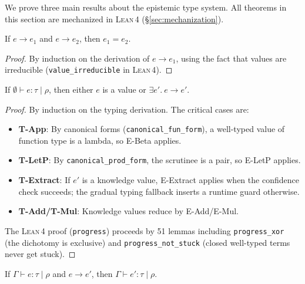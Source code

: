 \documentclass[acmsmall,screen,review,anonymous]{acmart}
\newcommand{\lean}{\textsc{Lean\,4}\xspace}
\begin{document}
We prove three main results about the epistemic type system.
All theorems in this section are mechanized in \lean
(\S\ref{sec:mechanization}).

\begin{theorem}[Determinism]
\label{thm:determinism}
If $e \longrightarrow e_1$ and $e \longrightarrow e_2$,
then $e_1 = e_2$.
\end{theorem}

\begin{proof}
By induction on the derivation of $e \longrightarrow e_1$,
using the fact that values are irreducible
(\texttt{value\_irreducible} in \lean).
\end{proof}

\begin{theorem}[Progress]
\label{thm:progress}
If $\emptyset \vdash e : \tau \mid \rho$, then either $e$ is a value or
$\exists e'.\ e \longrightarrow e'$.
\end{theorem}

\begin{proof}
By induction on the typing derivation.
The critical cases are:
\begin{itemize}
  \item \textbf{T-App}: By canonical forms
        (\texttt{canonical\_fun\_form}), a well-typed value of function
        type is a lambda, so E-Beta applies.
  \item \textbf{T-LetP}: By \texttt{canonical\_prod\_form}, the scrutinee
        is a pair, so E-LetP applies.
  \item \textbf{T-Extract}: If $e'$ is a knowledge value, E-Extract
        applies when the confidence check succeeds; the gradual typing
        fallback inserts a runtime guard otherwise.
  \item \textbf{T-Add/T-Mul}: Knowledge values reduce by E-Add/E-Mul.
\end{itemize}
The \lean proof (\texttt{progress}) proceeds by 51 lemmas including
\texttt{progress\_xor} (the dichotomy is exclusive) and
\texttt{progress\_not\_stuck} (closed well-typed terms never get stuck).
\end{proof}

\begin{theorem}[Preservation]
\label{thm:preservation}
If $\Gamma \vdash e : \tau \mid \rho$ and $e \longrightarrow e'$,
then $\Gamma \vdash e' : \tau \mid \rho$.
\end{theorem}
\end{document}
